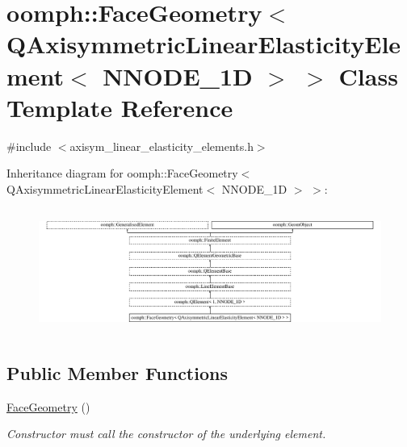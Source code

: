 \hypertarget{classoomph_1_1FaceGeometry_3_01QAxisymmetricLinearElasticityElement_3_01NNODE__1D_01_4_01_4}{}\section{oomph\+:\+:Face\+Geometry$<$ Q\+Axisymmetric\+Linear\+Elasticity\+Element$<$ N\+N\+O\+D\+E\+\_\+1D $>$ $>$ Class Template Reference}
\label{classoomph_1_1FaceGeometry_3_01QAxisymmetricLinearElasticityElement_3_01NNODE__1D_01_4_01_4}


{\ttfamily \#include $<$axisym\+\_\+linear\+\_\+elasticity\+\_\+elements.\+h$>$}

Inheritance diagram for oomph\+:\+:Face\+Geometry$<$ Q\+Axisymmetric\+Linear\+Elasticity\+Element$<$ N\+N\+O\+D\+E\+\_\+1D $>$ $>$\+:\begin{figure}[H]
\begin{center}
\leavevmode
\includegraphics[height=4.117647cm]{classoomph_1_1FaceGeometry_3_01QAxisymmetricLinearElasticityElement_3_01NNODE__1D_01_4_01_4}
\end{center}
\end{figure}
\subsection*{Public Member Functions}
\begin{DoxyCompactItemize}
\item 
\hyperlink{classoomph_1_1FaceGeometry_3_01QAxisymmetricLinearElasticityElement_3_01NNODE__1D_01_4_01_4_ab21305bb47d99ed60198556c06a856a7}{Face\+Geometry} ()
\begin{DoxyCompactList}\small\item\em Constructor must call the constructor of the underlying element. \end{DoxyCompactList}\end{DoxyCompactItemize}
